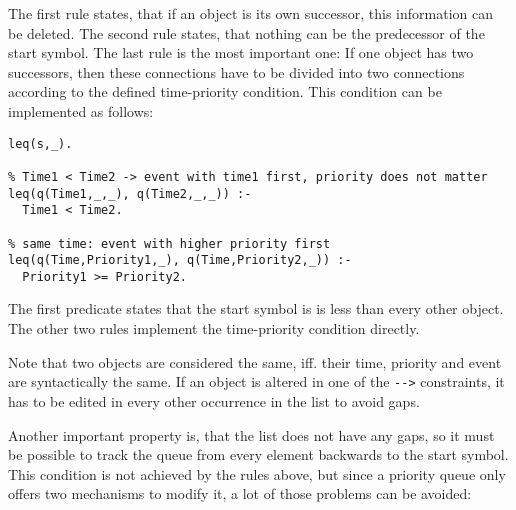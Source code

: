 The first rule states, that if an object is its own successor, this information can be deleted. The second rule states, that nothing can be the predecessor of the start symbol. The last rule is the most important one: If one object has two successors, then these connections have to be divided into two connections according to the defined time-priority condition. This condition can be implemented as follows:

\begin{lstlisting}
leq(s,_).

% Time1 < Time2 -> event with time1 first, priority does not matter
leq(q(Time1,_,_), q(Time2,_,_)) :- 
  Time1 < Time2.

% same time: event with higher priority first
leq(q(Time,Priority1,_), q(Time,Priority2,_)) :- 
  Priority1 >= Priority2.
\end{lstlisting}

The first predicate states that the start symbol is is less than every other object. The other two rules implement the time-priority condition directly.

Note that two objects are considered the same, iff. their time, priority and event are syntactically the same. If an object is altered in one of the \verb|-->| constraints, it has to be edited in every other occurrence in the   list to avoid gaps.

Another important property is, that the list does not have any gaps, so it must be possible to track the queue from every element backwards to the start symbol. This condition is not achieved by the rules above, but since a priority queue only offers two mechanisms to modify it, a lot of those problems can be avoided:

